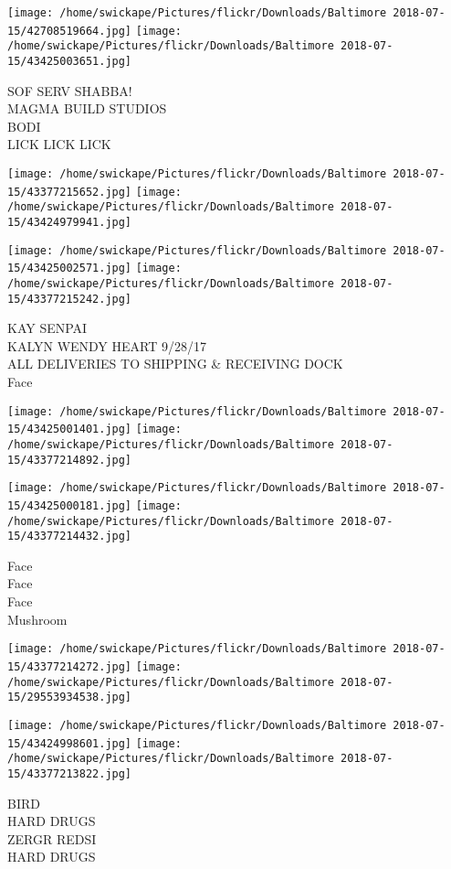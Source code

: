 \documentclass[10pt,letterpaper]{article}
\begin{document}
\texttt{[image: /home/swickape/Pictures/flickr/Downloads/Baltimore 2018-07-15/42708519664.jpg]}
\texttt{[image: /home/swickape/Pictures/flickr/Downloads/Baltimore 2018-07-15/43425003651.jpg]}

SOF SERV SHABBA!\\
MAGMA BUILD STUDIOS\\
BODI\\
LICK LICK LICK
\pagebreak

\texttt{[image: /home/swickape/Pictures/flickr/Downloads/Baltimore 2018-07-15/43377215652.jpg]}
\texttt{[image: /home/swickape/Pictures/flickr/Downloads/Baltimore 2018-07-15/43424979941.jpg]}

\texttt{[image: /home/swickape/Pictures/flickr/Downloads/Baltimore 2018-07-15/43425002571.jpg]}
\texttt{[image: /home/swickape/Pictures/flickr/Downloads/Baltimore 2018-07-15/43377215242.jpg]}

KAY SENPAI\\
KALYN WENDY HEART 9/28/17\\
ALL DELIVERIES TO SHIPPING \& RECEIVING DOCK\\
Face
\pagebreak

\texttt{[image: /home/swickape/Pictures/flickr/Downloads/Baltimore 2018-07-15/43425001401.jpg]}
\texttt{[image: /home/swickape/Pictures/flickr/Downloads/Baltimore 2018-07-15/43377214892.jpg]}

\texttt{[image: /home/swickape/Pictures/flickr/Downloads/Baltimore 2018-07-15/43425000181.jpg]}
\texttt{[image: /home/swickape/Pictures/flickr/Downloads/Baltimore 2018-07-15/43377214432.jpg]}

Face\\
Face\\
Face\\
Mushroom
\pagebreak

\texttt{[image: /home/swickape/Pictures/flickr/Downloads/Baltimore 2018-07-15/43377214272.jpg]}
\texttt{[image: /home/swickape/Pictures/flickr/Downloads/Baltimore 2018-07-15/29553934538.jpg]}

\texttt{[image: /home/swickape/Pictures/flickr/Downloads/Baltimore 2018-07-15/43424998601.jpg]}
\texttt{[image: /home/swickape/Pictures/flickr/Downloads/Baltimore 2018-07-15/43377213822.jpg]}

BIRD\\
HARD DRUGS\\
ZERGR REDSI\\
HARD DRUGS
\pagebreak
\end{document}
